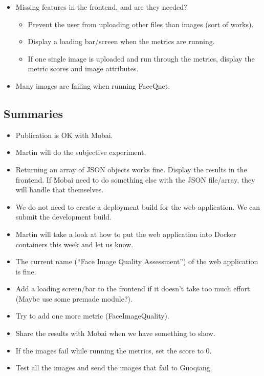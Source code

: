 \begin{itemize}
    \item Missing features in the frontend, and are they needed?
    \begin{itemize}
        \item Prevent the user from uploading other files than images (sort of works).
        \item Display a loading bar/screen when the metrics are running.
        \item If one single image is uploaded and run through the metrics, display the metric scores and image attributes.
    \end{itemize}
    \item Many images are failing when running FaceQnet. 
\end{itemize}

\subsection*{Summaries}
\begin{itemize}
    \item Publication is OK with Mobai.
    \item Martin will do the subjective experiment.
    \item Returning an array of JSON objects works fine. Display the results in the frontend. If Mobai need to do something else with the JSON file/array, they will handle that themselves.
    \item We do not need to create a deployment build for the web application. We can submit the development build.
    \item Martin will take a look at how to put the web application into Docker containers this week and let us know.
    \item The current name (“Face Image Quality Assessment”) of the web application is fine.
    \item Add a loading screen/bar to the frontend if it doesn't take too much effort. (Maybe use some premade module?).
    \item Try to add one more metric (FaceImageQuality).
    \item Share the results with Mobai when we have something to show.
    \item If the images fail while running the metrics, set the score to 0.
    \item Test all the images and send the images that fail to Guoqiang.
\end{itemize}


